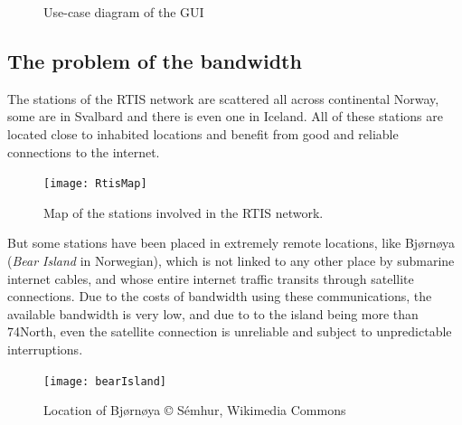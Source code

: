 \documentclass{themeensg}
\begin{document}
\begin{figure}[!ht]
	\begin{center}
	\end{center}
	\caption{Use-case diagram of the GUI}
\end{figure}

\subsection{The problem of the bandwidth}

The stations of the RTIS network are scattered all across continental Norway, some are in Svalbard and there is even one in Iceland. All of these stations are located close to inhabited locations and benefit from good and reliable connections to the internet.

\begin{figure}[!ht]
	\centering
	\texttt{[image: RtisMap]}
	\caption{Map of the stations involved in the RTIS network.}
\end{figure}

But some stations have been placed in extremely remote locations, like Bjørnøya (\textit{Bear Island} in Norwegian), which is not linked to any other place by submarine internet cables, and whose entire internet traffic transits through satellite connections. Due to the costs of bandwidth using these communications, the available bandwidth is very low, and due to to the island being more than 74\degre North, even the satellite connection is unreliable and subject to unpredictable interruptions. 

\begin{figure}[!ht]
	\centering
	\texttt{[image: bearIsland]}
	\caption{Location of Bjørnøya © Sémhur, Wikimedia Commons}
\end{figure}
\end{document}
